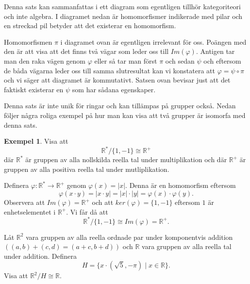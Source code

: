 \documentclass{article}
\theoremstyle{definition}
\newtheorem{exmp}[thm]{Exempel}
\begin{document}
Denna sats kan sammanfattas i ett diagram som egentligen tillhör kategoriteori och inte algebra.
I diagramet nedan är homomorfismer indikerade med pilar och en streckad pil betyder att det existerar en homomorfism. 

\begin{center}
\end{center}

Homomorfismen $\pi$ i diagramet ovan är egentligen irrelevant för oss. Poängen med den är att visa att det finns två vägar som leder oss 
till $Im(\varphi)$. Antigen tar man den raka vägen genom $\varphi$ eller så tar man först $\pi$ och sedan $\psi$ och eftersom 
de båda vägarna leder oss till samma slutresultat kan vi konstatera att $\varphi = \psi \circ \pi$ och vi säger att 
diagramet är kommutativt. Satsen ovan bevisar just 
att det faktiskt existerar en $\psi$ som har sådana egenskaper. 

Denna sats är inte unik för ringar och kan tillämpas på grupper också. Nedan följer några roliga exempel på hur man kan visa att 
två grupper är isomorfa med denna sats. 
\begin{exmp}
  Visa att 
  \[\mathbb{R}^*/\{1, -1\} \cong \mathbb{R}^+\]
  där $\mathbb{R}^*$ är gruppen av alla nollskilda reella tal under multiplikation och där $\mathbb{R}^+$ är gruppen av alla positiva reella tal under mutliplikation.

  Definera $\varphi: \mathbb{R}^* \rightarrow \mathbb{R}^+$ genom $\varphi(x) = |x|.$
  Denna är en homomorfism eftersom 
  \[\varphi(x \cdot y) = |x \cdot y| = |x| \cdot |y| = \varphi(x) \cdot \varphi(y).\]
  Observera att $Im(\varphi) = \mathbb{R}^+$ och att $ker(\varphi) = \{1, -1\}$ eftersom $1$ är enhetselementet i $\mathbb{R}^+$. Vi får då att 
  \[\mathbb{R}^* / \{1, -1\} \cong Im(\varphi) = \mathbb{R}^+.\] 
\end{exmp}

\begin{ovning}{1}
  Låt $\mathbb{R}^2$ vara gruppen av alla reella ordnade par under komponentvis addition $((a, b) + (c, d) = (a + c, b + d))$ och $\mathbb{R}$
  vara gruppen av alla reella tal under addition. Definera 
  \[H = \biggl\{x \cdot (\sqrt 5, -\pi) \; | \; x \in \mathbb{R} \biggr\}.\]
  Visa att $\mathbb{R}^2 / H \cong \mathbb{R}.$
\end{ovning}
\end{document}
